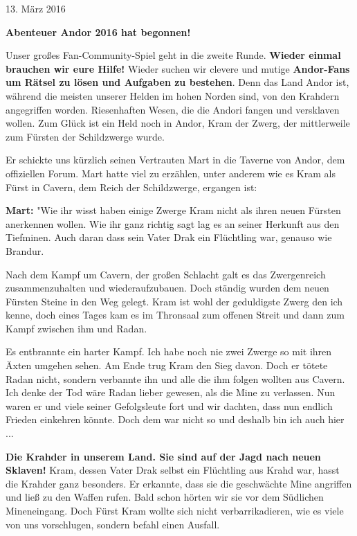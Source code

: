 \documentclass[10pt, a4paper, oneside]{book}
\newcommand{\bildmitts}[2][height=0.32\textwidth,width=0.48\textwidth,keepaspectratio]{%
    \begin{center}
        \texttt{[image: Chronik der Andorversen/Bilder/\#2]}
    \end{center}
}
\begin{document}
\begin{multicols}{2}
\begin{center}
    13. März 2016
\end{center}



\textbf{Abenteuer Andor 2016 hat begonnen!}

Unser großes Fan-Community-Spiel geht in die zweite Runde. \textbf{Wieder einmal brauchen wir eure Hilfe!} Wieder suchen wir clevere und mutige \textbf{Andor-Fans um Rätsel zu lösen und Aufgaben zu bestehen}. Denn das Land Andor ist, während die meisten unserer Helden im hohen Norden sind, von den Krahdern angegriffen worden. Riesenhaften Wesen, die die Andori fangen und versklaven wollen. Zum Glück ist ein Held noch in Andor, Kram der Zwerg, der mittlerweile zum Fürsten der Schildzwerge wurde.

Er schickte uns kürzlich seinen Vertrauten Mart in die Taverne von Andor, dem offiziellen Forum. Mart hatte viel zu erzählen, unter anderem wie es Kram als Fürst in Cavern, dem Reich der Schildzwerge, ergangen ist:

\textbf{Mart:} "Wie ihr wisst haben einige Zwerge Kram nicht als ihren neuen Fürsten anerkennen wollen. Wie ihr ganz richtig sagt lag es an seiner Herkunft aus den Tiefminen. Auch daran dass sein Vater Drak ein Flüchtling war, genauso wie Brandur.

Nach dem Kampf um Cavern, der großen Schlacht galt es das Zwergenreich zusammenzuhalten und wiederaufzubauen. Doch ständig wurden dem neuen Fürsten Steine in den Weg gelegt. Kram ist wohl der geduldigste Zwerg den ich kenne, doch eines Tages kam es im Thronsaal zum offenen Streit und dann zum Kampf zwischen ihm und Radan.

Es entbrannte ein harter Kampf. Ich habe noch nie zwei Zwerge so mit ihren Äxten umgehen sehen. Am Ende trug Kram den Sieg davon. Doch er tötete Radan nicht, sondern verbannte ihn und alle die ihm folgen wollten aus Cavern. Ich denke der Tod wäre Radan lieber gewesen, als die Mine zu verlassen. Nun waren er und viele seiner Gefolgsleute fort und wir dachten, dass nun endlich Frieden einkehren könnte. Doch dem war nicht so und deshalb bin ich auch hier ...

\textbf{Die Krahder in unserem Land. Sie sind auf der Jagd nach neuen Sklaven!} Kram, dessen Vater Drak selbst ein Flüchtling aus Krahd war, hasst die Krahder ganz besonders. Er erkannte, dass sie die geschwächte Mine angriffen und ließ zu den Waffen rufen. Bald schon hörten wir sie vor dem Südlichen Mineneingang. Doch Fürst Kram wollte sich nicht verbarrikadieren, wie es viele von uns vorschlugen, sondern befahl einen Ausfall.


\end{multicols}
\end{document}
